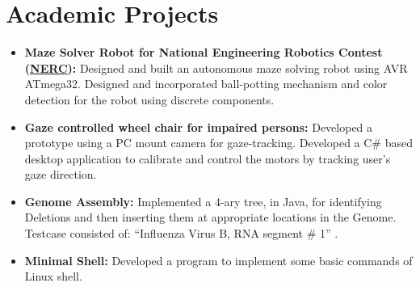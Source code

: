 \documentclass[letterpaper,11pt]{article}
\newcommand{\resumeItem}[2]{
  \item\small{
    \textbf{#1}{#2 \vspace{-2pt}}
  }
}
\newcommand{\resumeSubItem}[2]{\resumeItem{#1}{#2}\vspace{-4pt}}
\newcommand{\resumeSubHeadingListStart}{\begin{itemize}[leftmargin=*]}
\newcommand{\resumeSubHeadingListEnd}{\end{itemize}}
\begin{document}
\section{Academic Projects}
  \resumeSubHeadingListStart
    \resumeSubItem{Maze Solver Robot for National Engineering Robotics Contest (\href{http://www.nerc.com.pk/}{NERC}): }
      {Designed and built an autonomous maze solving robot using AVR ATmega32. Designed and incorporated ball-potting mechanism and color detection for the robot using discrete components.}
    \resumeSubItem{Gaze controlled wheel chair for impaired persons: }
      {Developed a prototype using a PC mount camera for gaze-tracking. Developed a C\# based desktop application to calibrate and control the motors by tracking user's gaze direction.}
    \resumeSubItem{Genome Assembly: }
      {Implemented a 4-ary tree, in Java, for identifying Deletions and then inserting them at appropriate locations in the Genome. Testcase consisted of: “Influenza Virus B, RNA segment \# 1” .}
    \resumeSubItem{Minimal Shell: }
      {Developed a program to implement some basic commands of Linux shell.}
  \resumeSubHeadingListEnd

\end{document}
